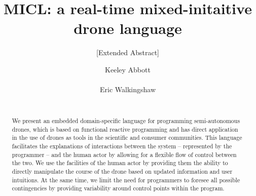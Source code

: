\documentclass{sig-alternate-05-2015}
\begin{document}




\title{MICL: a real-time mixed-initaitive drone language}
\subtitle{[Extended Abstract]}

\author{
\alignauthor
Keeley Abbott\\
\\
\alignauthor
Eric Walkingshaw\\
\\
}

\maketitle
\begin{abstract}
We present an embedded domain-specific language for programming
semi-autonomous drones, which is based on functional reactive programming and
has direct application in the use of drones as tools in the scientific and
consumer communities. This language facilitates the explanations of
interactions between the system -- represented by the programmer -- and the
human actor by allowing for a flexible flow of control between the two. We use
the facilities of the human actor by providing them the ability to
directly manipulate the course of the drone based on updated information and
user intuitions. At the same time, we limit the need for programmers to
foresee all possible contingencies by providing variability around control
points within the program.
\end{abstract}
\end{document}
